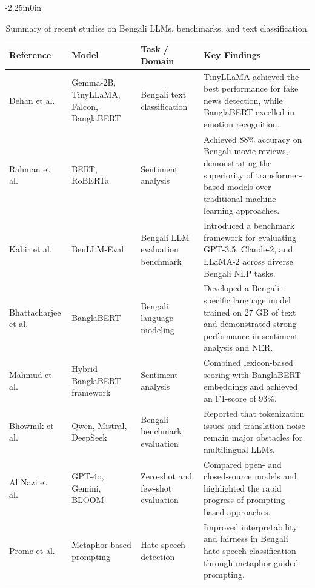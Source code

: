 \documentclass[10pt,letterpaper]{article}
\begin{document}
\begin{table}[H]
\begin{adjustwidth}{-2.25in}{0in}
\centering
\caption{Summary of recent studies on Bengali LLMs, benchmarks, and text classification.}
\label{tab:bangla_llm_progress}
\small
\renewcommand{\arraystretch}{1.08}
\setlength{\tabcolsep}{4pt}
\begin{tabular}{|>{\raggedright\arraybackslash}p{3cm}|>{\raggedright\arraybackslash}p{3.0cm}|>{\raggedright\arraybackslash}p{3.0cm}|>{\raggedright\arraybackslash}p{8.1cm}|}
\hline
\textbf{Reference} & \textbf{Model} & \textbf{Task / Domain} & \textbf{Key Findings} \\
\hline
Dehan et al.~\cite{b1} & Gemma-2B, TinyLLaMA, Falcon, BanglaBERT & Bengali text classification & TinyLLaMA achieved the best performance for fake news detection, while BanglaBERT excelled in emotion recognition. \\
\hline
Rahman et al.~\cite{b2} & BERT, RoBERTa & Sentiment analysis & Achieved 88\% accuracy on Bengali movie reviews, demonstrating the superiority of transformer-based models over traditional machine learning approaches. \\
\hline
Kabir et al.~\cite{b3} & BenLLM-Eval & Bengali LLM evaluation benchmark & Introduced a benchmark framework for evaluating GPT-3.5, Claude-2, and LLaMA-2 across diverse Bengali NLP tasks. \\
\hline
Bhattacharjee et al.~\cite{b4} & BanglaBERT & Bengali language modeling & Developed a Bengali-specific language model trained on 27 GB of text and demonstrated strong performance in sentiment analysis and NER. \\
\hline
Mahmud et al.~\cite{b5} & Hybrid BanglaBERT framework & Sentiment analysis & Combined lexicon-based scoring with BanglaBERT embeddings and achieved an F1-score of 93\%. \\
\hline
Bhowmik et al.~\cite{b6} & Qwen, Mistral, DeepSeek & Bengali benchmark evaluation & Reported that tokenization issues and translation noise remain major obstacles for multilingual LLMs. \\
\hline
Al Nazi et al.~\cite{b7} & GPT-4o, Gemini, BLOOM & Zero-shot and few-shot evaluation & Compared open- and closed-source models and highlighted the rapid progress of prompting-based approaches. \\
\hline
Prome et al.~\cite{b8} & Metaphor-based prompting & Hate speech detection & Improved interpretability and fairness in Bengali hate speech classification through metaphor-guided prompting. \\

\end{tabular}
\end{adjustwidth}
\end{table}
\end{document}
